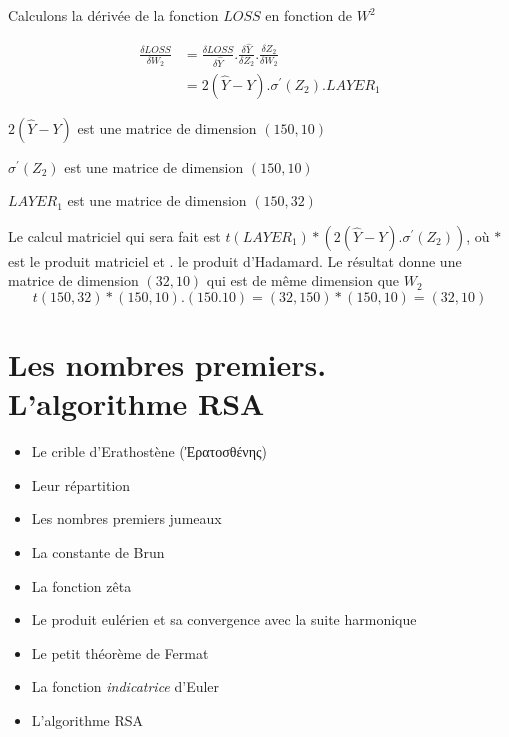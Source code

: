 Calculons la dérivée de la fonction $LOSS$ en fonction de $W^2$ 

\begin{align}
\frac{\delta LOSS}{\delta W_2} & =\frac{\delta LOSS}{\delta \hat{Y}} . \frac{\delta \hat{Y}}{\delta Z_2}. \frac{\delta Z_2}{\delta W_2 } \\
 &= 2(\hat{Y}-Y) . \sigma ^\prime (Z_2) . LAYER_1 
\end{align}

$2(\hat{Y}-Y)$ est une matrice de dimension $(150, 10)$

$\sigma ^\prime (Z_2)$ est une matrice de dimension $(150,10)$

$LAYER_1$ est une matrice de dimension $(150,32)$

Le calcul matriciel qui sera fait est $t(LAYER_1)* (2(\hat{Y}-Y) . \sigma ^\prime (Z_2))$, où $*$ est le produit matriciel et $.$ le produit d'Hadamard.
Le résultat donne une matrice de dimension $(32,10)$ qui est de même dimension que $W_2$
$$
t(150,32) * (150,10).(150.10) = (32,150)*(150,10)=(32,10)
$$


\section{Les nombres premiers. L'algorithme RSA}

\begin{itemize}
	\item Le crible d'Erathostène (Ἐρατοσθένης)
	\item Leur répartition
	\item Les nombres premiers jumeaux
	\item La constante de Brun 
	\item La fonction zêta
	\item Le produit eulérien et sa convergence avec la suite harmonique
	\item Le petit théorème de Fermat
	\item La fonction \textit{indicatrice} d'Euler
	\item L'algorithme RSA
\end{itemize}

